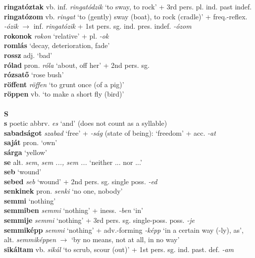 \documentclass[11pt]{article}
\begin{document}
\textbf{ringatóztak} vb. inf. \emph{ringatódzik} `to sway, to rock' +
3rd pers. pl. ind. past indef. \\
\textbf{ringatózom} vb. \emph{ringat} `to (gently) sway
(boat), to rock (cradle)' + freq.\hyp{}reflex. \emph{-ózik}
$\rightarrow$ inf. \emph{ringatózik} +
1st pers. sg. ind. pres. indef. \emph{-ózom} \\
\textbf{rokonok} \emph{rokon} `relative' + pl. \emph{-ok} \\
\textbf{romlás} `decay, deterioration, fade' \\
\textbf{rossz} adj. `bad' \\
\textbf{rólad} pron. \emph{róla} `about, off her' + 2nd pers. sg. \\
\textbf{rózsatő} `rose bush' \\
\textbf{röffent} \emph{röffen} `to grunt once (of a pig)' \\
\textbf{röppen} vb. `to make a short fly (bird)' \\
\ \\
\noindent \textbf{\large S} \\
\textbf{s} poetic abbrv. \emph{es} `and' (does not count as a
syllable) \\
\textbf{sabadságot} \emph{szabad} `free' + \emph{-ság} (state of
being): `freedom' + acc. \emph{-at} \\
\textbf{saját} pron. `own' \\
\textbf{sárga} `yellow' \\
\textbf{se} alt. \emph{sem}, \emph{sem ..., sem ...}  `neither
  ... nor ...' \\
\textbf{seb} `wound' \\
\textbf{sebed} \emph{seb} `wound' + 2nd pers. sg. single
poss. \emph{-ed} \\
\textbf{senkinek} pron. \emph{senki} `no one, nobody' \\
\textbf{semmi} `nothing' \\
\textbf{semmiben} \emph{semmi} `nothing' + iness. \emph{-ben} `in' \\
\textbf{semmije} \emph{semmi} `nothing' + 3rd
pers. sg. single\hyp{}poss. poss. \emph{-je} \\
\textbf{semmiképp} \emph{semmi} `nothing' +
adv.\hyp{}forming \emph{-képp} `in a certain way (-ly), as',
alt. \emph{semmiképpen} $\rightarrow$ `by no means, not at all, in no
way'\\
\textbf{sikáltam} vb. \emph{sikál} `to scrub, scour (out)' + 1st
pers. sg. ind. past. def. \emph{-am} \\
\end{document}

